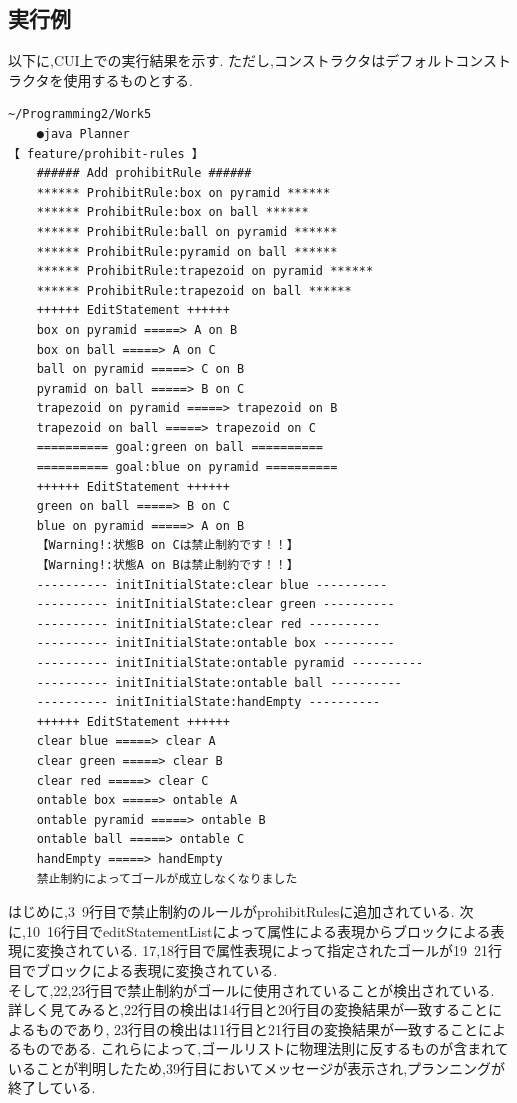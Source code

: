 \documentclass[uplatex,12pt]{jsarticle}
\begin{document}
\subsection{実行例}
以下に,CUI上での実行結果を示す.
ただし,コンストラクタはデフォルトコンストラクタを使用するものとする.
\begin{lstlisting}[caption=禁止制約によりゴールが成立しなくなった場合, label=mid]
    ~/Programming2/Work5
    ●java Planner                                                                                                                                                                                                    【 feature/prohibit-rules 】
    ###### Add prohibitRule ######
    ****** ProhibitRule:box on pyramid ******
    ****** ProhibitRule:box on ball ******
    ****** ProhibitRule:ball on pyramid ******
    ****** ProhibitRule:pyramid on ball ******
    ****** ProhibitRule:trapezoid on pyramid ******
    ****** ProhibitRule:trapezoid on ball ******
    ++++++ EditStatement ++++++
    box on pyramid =====> A on B
    box on ball =====> A on C
    ball on pyramid =====> C on B
    pyramid on ball =====> B on C
    trapezoid on pyramid =====> trapezoid on B
    trapezoid on ball =====> trapezoid on C
    ========== goal:green on ball ==========
    ========== goal:blue on pyramid ==========
    ++++++ EditStatement ++++++
    green on ball =====> B on C
    blue on pyramid =====> A on B
    【Warning!:状態B on Cは禁止制約です！！】
    【Warning!:状態A on Bは禁止制約です！！】
    ---------- initInitialState:clear blue ----------
    ---------- initInitialState:clear green ----------
    ---------- initInitialState:clear red ----------
    ---------- initInitialState:ontable box ----------
    ---------- initInitialState:ontable pyramid ----------
    ---------- initInitialState:ontable ball ----------
    ---------- initInitialState:handEmpty ----------
    ++++++ EditStatement ++++++
    clear blue =====> clear A
    clear green =====> clear B
    clear red =====> clear C
    ontable box =====> ontable A
    ontable pyramid =====> ontable B
    ontable ball =====> ontable C
    handEmpty =====> handEmpty
    禁止制約によってゴールが成立しなくなりました
\end{lstlisting}
はじめに,3~9行目で禁止制約のルールがprohibitRulesに追加されている.
次に,10~16行目でeditStatementListによって属性による表現からブロックによる表現に変換されている.
17,18行目で属性表現によって指定されたゴールが19~21行目でブロックによる表現に変換されている. \\
そして,22,23行目で禁止制約がゴールに使用されていることが検出されている.
詳しく見てみると,22行目の検出は14行目と20行目の変換結果が一致することによるものであり,
23行目の検出は11行目と21行目の変換結果が一致することによるものである.
これらによって,ゴールリストに物理法則に反するものが含まれていることが判明したため,39行目においてメッセージが表示され,プランニングが終了している.
\end{document}
